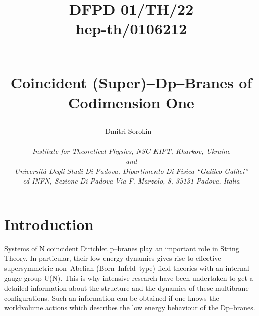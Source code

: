 \documentclass[a4paper,12pt]{article}
\begin{document}
\title{
\begin{flushright}
{\small {DFPD 01/TH/22\\
\vspace{-15pt}
 hep-th/0106212
} }
\end{flushright}
~\\
{Coincident (Super)--Dp--Branes of Codimension One}
 }

\bigskip
\author{
Dmitri Sorokin
~\\
~\\
{\it Institute for Theoretical Physics, NSC KIPT,
Kharkov, Ukraine}\\
{\it and}\\
{\it Universit\`a Degli Studi Di Padova,
Dipartimento Di Fisica ``Galileo Galilei''}\\
{\it ed INFN, Sezione Di Padova Via F. Marzolo, 8, 35131 Padova,
Italia}\\
}
\date{}

\maketitle


\bigskip
\noindent
\renewcommand{\thefootnote}{\arabic{footnote}}
\thispagestyle{empty}
\newpage
\section{Introduction}
Systems of N coincident Dirichlet p--branes play an important role
in String Theory. In particular, their low energy dynamics gives
rise to effective supersymmetric non--Abelian (Born--Infeld--type)
field theories with an internal gauge group U(N). This is why
intensive research have been undertaken to get a detailed
information about the structure and the dynamics of these
multibrane configurations. Such an information can be obtained if
one knows the worldvolume actions which describes the low energy
behaviour of the Dp--branes.
\end{document}
